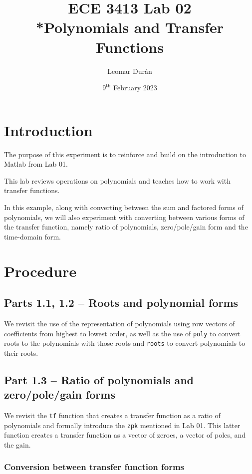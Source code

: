 \documentclass[12pt]{article}
\title{ECE 3413 Lab 02\\*Polynomials and Transfer Functions}
\author{Leomar Dur\'an}
\date{$9^{\text{th}}$ February 2023}
\begin{document}
\maketitle
\newpage

\section{Introduction}

The purpose of this experiment is to reinforce and build on the introduction to Matlab from Lab 01.

This lab reviews operations on polynomials and teaches how to work with transfer functions.

In this example,
along with converting between the sum and factored forms of polynomials,
we will also experiment with converting between various forms of the transfer function,
namely ratio of polynomials, zero/pole/gain form and the time-domain form.

\section{Procedure}

\subsection{Parts 1.1, 1.2 -- Roots and polynomial forms}

We revisit the use of the representation of polynomials using row vectors of coefficients from highest to lowest order, 
as well as the use of \texttt{poly} to convert roots to the polynomials with those roots and
\texttt{roots} to convert polynomials to their roots.

\subsection{Part 1.3 -- Ratio of polynomials and zero/pole/gain forms}

We revisit the \texttt{tf} function that creates a transfer function as a ratio of polynomials and formally introduce the \texttt{zpk} mentioned in Lab 01. This latter function creates a transfer function as a vector of zeroes, a vector of poles, and the gain.

\subsubsection{Conversion between transfer function forms}
\end{document}
